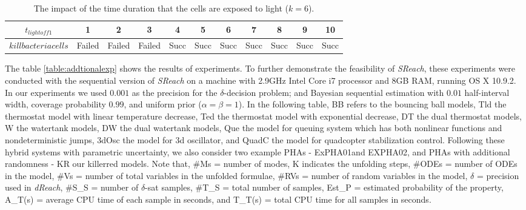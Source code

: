 \begin{table*}[th!]
\captionsetup{font=scriptsize}
\centering
    \begin{tabular}{|c|c|c|c|c|c|c|c|c|c|c|}
    \hline
    $t_{lightoff1}$ & 1 & 2 & 3 & 4 & 5 & 6 & 7 & 8 & 9 & 10 \\ \hline
    $kill bacteria cells$ & Failed  & Failed    &  Failed   & Succ   & Succ & Succ & Succ & Succ & Succ & Succ    \\ \hline
    \end{tabular}
    \caption{The impact of the time duration that the cells are exposed to light ($k=6$).}
    \label{table:kr03}
\end{table*}

The table \ref{table:addtionalexp} shows the results of experiments. To further demonstrate the feasibility of {\it SReach}, these experiments were conducted with the sequential version of {\it SReach} on a machine with 2.9GHz Intel Core i7 processor and 8GB RAM, running OS X 10.9.2. In our experiments we used $0.001$ as the precision for the $\delta$-decision problem; and Bayesian sequential estimation with $0.01$ half-interval width, coverage probability $0.99$, and uniform prior ($\alpha = \beta = 1$). In the following table, BB refers to the bouncing ball models, Tld the thermostat model with linear temperature decrease, Ted the thermostat model with exponential decrease, DT the dual thermostat models, W the watertank models, DW the dual watertank models, Que the model for queuing system which has both nonlinear functions and nondeterministic jumps, 3dOsc the model for 3d oscillator, and QuadC the model for quadcopter stabilization control. Following these hybrid systems with parametric uncertainty, we also consider two example PHAs - ExPHA01and EXPHA02, and PHAs with additional randomness - KR our killerred models. Note that, \#Ms = number of modes, K indicates the unfolding steps, \#ODEs = number of ODEs in the model, \#Vs = number of total variables in the unfolded formulae, \#RVs = number of random variables in the model, $\delta$ = precision used in {\it dReach}, \#S\_S = number of $\delta$-sat samples, \#T\_S = total number of samples, Est\_P = estimated probability of the property, A\_T(s) = average CPU time of each sample in seconds, and T\_T(s) = total CPU time for all samples in seconds.

